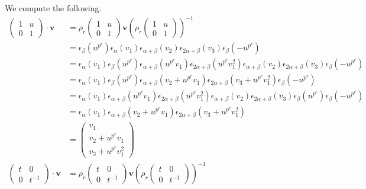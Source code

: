We compute the following.
\begin{align*}
\left(\begin{matrix} 1 & u \\ 0 & 1\end{matrix}\right) \cdot \mathbf{v} &= \rho_r\left(\begin{matrix} 1 & u \\ 0 & 1\end{matrix}\right) \mathbf{v}\left( \rho_r\left(\begin{matrix} 1 & u \\ 0 & 1\end{matrix}\right)\right)^{-1} \\
&=\epsilon_\beta (u^{p^r}) \epsilon_\alpha (v_1)\epsilon_{\alpha+\beta}(v_2) \epsilon_{2\alpha+\beta}(v_3) \epsilon_\beta (-u^{p^r}) \\
&=\epsilon_\alpha (v_1) \epsilon_\beta (u^{p^r}) \epsilon_{\alpha+\beta}(u^{p^r}v_1) \epsilon_{2\alpha+\beta}(u^{p^r}v_1^2) \epsilon_{\alpha+\beta}(v_2) \epsilon_{2\alpha+\beta}(v_3) \epsilon_\beta (-u^{p^r})  \\
&=\epsilon_\alpha (v_1) \epsilon_\beta (u^{p^r}) \epsilon_{\alpha+\beta}(v_2 + u^{p^r}v_1) \epsilon_{2\alpha+\beta}(v_3 + u^{p^r}v_1^2)  \epsilon_\beta (-u^{p^r})  \\
&=\epsilon_\alpha (v_1) \epsilon_{\alpha+\beta}(u^{p^r}v_1) \epsilon_{2\alpha+\beta}(u^{p^r}v_1^2) \epsilon_{\alpha+\beta}(v_2) \epsilon_{2\alpha+\beta}(v_3)\epsilon_\beta (u^{p^r})  \epsilon_\beta (-u^{p^r})  \\
&=\epsilon_\alpha (v_1)  \epsilon_{\alpha+\beta}(v_2 + u^{p^r}v_1) \epsilon_{2\alpha+\beta}(v_3 + u^{p^r}v_1^2) \\
&= \left(\begin{matrix} v_1 \\ v_2 + u^{p^r}v_1\\ v_3 + u^{p^r}v_1^2 \end{matrix}\right)\\
\left(\begin{matrix} t & 0 \\ 0 & t^{-1}\end{matrix}\right) \cdot \mathbf{v} &=
\rho_r\left(\begin{matrix} t & 0 \\ 0 & t^{-1}\end{matrix}\right) \mathbf{v}\left( \rho_r\left(\begin{matrix} t & 0 \\ 0 & t^{-1}\end{matrix}\right)\right)^{-1} \\

\end{align*}
